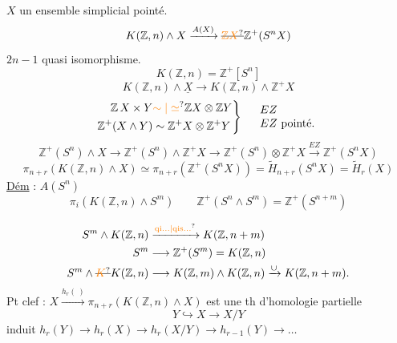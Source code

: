 \begin{center}\uuline{\hspace{2cm}}\end{center}
$X$ un ensemble simplicial pointé.
\[
K(\mathbb Z,n)\wedge X\xrightarrow{A(X)}\deleted{\unsure{\mathbb Z X}}\mathbb Z^{+}(S^nX)
\]
$2n-1$ quasi isomorphisme.
\[
K(\mathbb Z,n)=\mathbb Z^{+}[S^n]
\]
\[
K(\mathbb Z,n)\wedge\underline X\longrightarrow K(\mathbb Z,n)\wedge\mathbb Z^+X
\]
\[
\left.\begin{aligned}
\mathbb Z\,X\times Y&\unsure{\sim|\simeq}\mathbb ZX\otimes\mathbb ZY\\
\mathbb Z^+(X\wedge Y)&\sim\mathbb Z^+X\otimes\mathbb Z^+Y
\end{aligned}\right\}\quad
\begin{array}{l}EZ\\ EZ\ \text{pointé.}\end{array}
\]
\[
\mathbb Z^+(S^n)\wedge X\longrightarrow\mathbb Z^+(S^n)\wedge\mathbb Z^+X
\longrightarrow\mathbb Z^+(S^n)\otimes\mathbb Z^+X\xrightarrow{EZ}\mathbb Z^+(S^nX)
\]
\[
\pi_{n+r}(K(\mathbb Z,n)\wedge X)\simeq\pi_{n+r}(\mathbb Z^+(S^nX))
=\widetilde H_{n+r}(S^nX)=\widetilde H_r(X)
\]
\uline{Dém} : $A(S^n)$
\[
\pi_i(K(\mathbb Z,n)\wedge S^m)\qquad
\mathbb Z^+(S^n\wedge S^m)=\mathbb Z^+(S^{n+m})
\]

\noindent{}
\[
\begin{aligned}
S^m\wedge K(\mathbb Z,n)&\xrightarrow{\unsure{\mathrm{qi}\ldots|\mathrm{qis}\ldots}} K(\mathbb Z,n+m)\\
S^m&\longrightarrow\mathbb Z^+(S^m)=K(\mathbb Z,n)\\
S^m\wedge\deleted{\unsure{K}}K(\mathbb Z,n)&\longrightarrow K(\mathbb Z,m)\wedge K(\mathbb Z,n)\xrightarrow{\cup}K(\mathbb Z,n+m).
\end{aligned}
\]
Pt clef : $X\xrightarrow{h_r(\ )}\pi_{n+r}(K(\mathbb Z,n)\wedge X)$ est une th d'homologie partielle
\[
Y\hookrightarrow X\longrightarrow X/Y
\]
induit $h_r(Y)\longrightarrow h_r(X)\longrightarrow h_r(X/Y)\longrightarrow h_{r-1}(Y)\longrightarrow\ldots$

